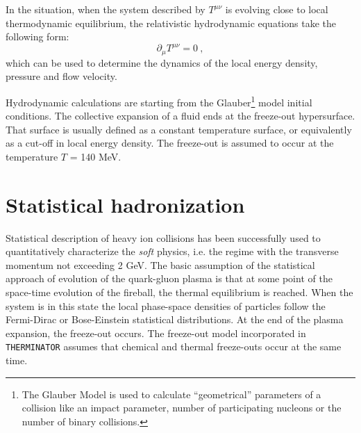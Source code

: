   In the situation, when the system described by $T^{\mu\nu}$ is evolving close to local thermodynamic equilibrium, the relativistic hydrodynamic equations take the following form:
  \begin{equation}
    \partial_{\mu} T^{\mu\nu} = 0~,
  \end{equation}
  which can be used to determine the dynamics of the local energy density, pressure and flow velocity.

  Hydrodynamic calculations are starting from the Glauber\footnote{The Glauber Model is used to calculate ``geometrical'' parameters of a collision like an impact parameter, number of participating nucleons or the number of binary collisions.}
  model initial conditions.
  The collective expansion of a fluid ends at the freeze-out hypersurface.
  That surface is usually defined as a constant temperature surface, or equivalently as a cut-off in local energy density.
  The freeze-out is assumed to occur at the temperature $T$ = 140 MeV.

  \section{Statistical hadronization}
    Statistical description of heavy ion collisions has been successfully used to quantitatively characterize the \textit{soft} physics, i.e. the regime with the transverse momentum not exceeding 2 GeV.
    The basic assumption of the statistical approach of evolution of the quark-gluon plasma is that at some point of the space-time evolution of the fireball, the thermal equilibrium is reached.
    When the system is in this state the local phase-space densities of particles follow the Fermi-Dirac or Bose-Einstein statistical distributions.
    At the end of the plasma expansion, the freeze-out occurs.
    The freeze-out model incorporated in \verb|THERMINATOR| assumes that chemical and thermal freeze-outs occur at the same time.
